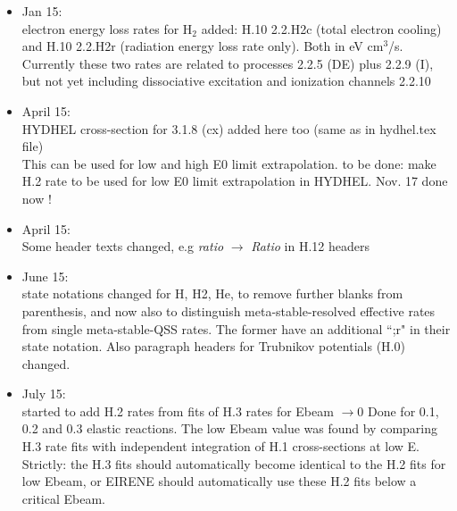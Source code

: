 \documentclass[12pt,dvipdfmx]{article}
\begin{document}
\begin{itemize}
  some reaction headers edited, in H.12 (for automatic online processing)
  \item Jan 15:\\
  electron energy loss rates for H$_2$ added: H.10  2.2.H2c (total electron cooling)
  and H.10 2.2.H2r  (radiation energy loss rate only). Both in eV cm$^3$/s. Currently these two rates are
  related to processes 2.2.5 (DE) plus 2.2.9 (I), but not yet including dissociative excitation and ionization channels 2.2.10
  \item April 15:\\
  HYDHEL cross-section for 3.1.8 (cx) added here too (same as in hydhel.tex file)\\
  This can be used for low and high E0 limit extrapolation.
  to be done: make H.2 rate to be used for low E0 limit extrapolation in HYDHEL. Nov. 17 done now !
  \item April 15:\\
  Some header texts changed, e.g \emph{ratio} $\rightarrow$ \emph{Ratio} in H.12 headers
  \item June 15:\\
  state notations changed for H, H2, He, to remove further blanks from parenthesis, and
  now also to distinguish meta-stable-resolved effective rates from single
  meta-stable-QSS rates. The former have an additional ``;r" in their state notation.
  Also paragraph headers for Trubnikov potentials (H.0) changed.
 \item July 15:\\
 started to add H.2 rates from fits of H.3 rates for Ebeam $\rightarrow 0$
 Done for 0.1, 0.2 and 0.3 elastic reactions. The low Ebeam value was found by comparing H.3 rate fits
 with independent integration of H.1 cross-sections at low E. Strictly: the H.3 fits should
 automatically
 become identical to the H.2 fits for low Ebeam, or EIRENE should automatically use these H.2 fits below a critical Ebeam.


\end{itemize}
\end{document}
